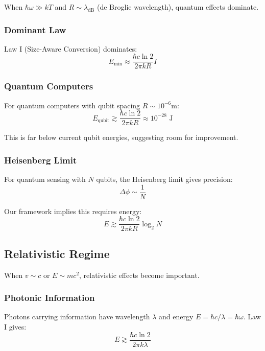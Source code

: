 \documentclass[11pt,a4paper]{article}
\theoremstyle{plain}
\theoremstyle{definition}
\theoremstyle{remark}
\begin{document}
When $\hbar\omega \gg kT$ and $R \sim \lambda_{\text{dB}}$ (de Broglie wavelength), quantum effects dominate.

\subsubsection{Dominant Law}

Law I (Size-Aware Conversion) dominates:
\begin{equation}
E_{\text{min}} \approx \frac{\hbar c\ln 2}{2\pi kR}I
\end{equation}

\subsubsection{Quantum Computers}

For quantum computers with qubit spacing $R \sim 10^{-6}$m:
\begin{equation}
E_{\text{qubit}} \gtrsim \frac{\hbar c\ln 2}{2\pi kR} \approx 10^{-28}\text{ J}
\end{equation}

This is far below current qubit energies, suggesting room for improvement.

\subsubsection{Heisenberg Limit}

For quantum sensing with $N$ qubits, the Heisenberg limit gives precision:
\begin{equation}
\Delta\phi \sim \frac{1}{N}
\end{equation}

Our framework implies this requires energy:
\begin{equation}
E \gtrsim \frac{\hbar c\ln 2}{2\pi kR}\log_2 N
\end{equation}

\subsection{Relativistic Regime}

When $v \sim c$ or $E \sim mc^2$, relativistic effects become important.

\subsubsection{Photonic Information}

Photons carrying information have wavelength $\lambda$ and energy $E = \hbar c/\lambda = \hbar\omega$. Law I gives:
\begin{equation}
E \gtrsim \frac{\hbar c\ln 2}{2\pi k\lambda}
\end{equation}
\end{document}
